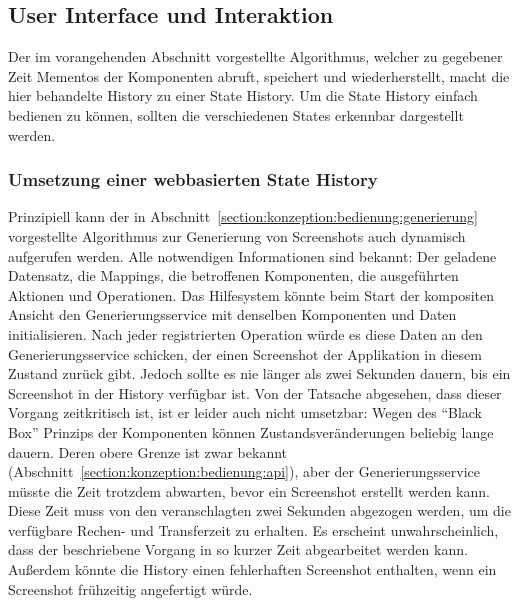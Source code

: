 \documentclass[
	headsepline,
	footsepline,
	fontsize=12pt,
	bibliography=totoc
]{scrbook}
\begin{document}
\subsection{User Interface und Interaktion}
\label{section:konzeption:history:ui}


Der im vorangehenden Abschnitt vorgestellte Algorithmus, welcher zu gegebener Zeit Mementos der Komponenten abruft, speichert und wiederherstellt, macht die hier behandelte History zu einer State History. Um die State History einfach bedienen zu können, sollten die verschiedenen States erkennbar dargestellt werden.

\subsubsection{Umsetzung einer webbasierten State History}


Prinzipiell kann der in Abschnitt~\ref{section:konzeption:bedienung:generierung} vorgestellte Algorithmus zur Generierung von Screenshots auch dynamisch aufgerufen werden. Alle notwendigen Informationen sind bekannt: Der geladene Datensatz, die Mappings, die betroffenen Komponenten, die ausgeführten Aktionen und Operationen. Das Hilfesystem könnte beim Start der kompositen Ansicht den Generierungsservice mit denselben Komponenten und Daten initialisieren. Nach jeder registrierten Operation würde es diese Daten an den Generierungsservice schicken, der einen Screenshot der Applikation in diesem Zustand zurück gibt. Jedoch sollte es nie länger als zwei Sekunden dauern, bis ein Screenshot in der History verfügbar ist. Von der Tatsache abgesehen, dass dieser Vorgang zeitkritisch ist, ist er leider auch nicht umsetzbar: Wegen des \enquote{Black Box} Prinzips der Komponenten können Zustandsveränderungen beliebig lange dauern. Deren obere Grenze ist zwar bekannt (Abschnitt~\ref{section:konzeption:bedienung:api}), aber der Generierungsservice müsste die Zeit trotzdem abwarten, bevor ein Screenshot erstellt werden kann. Diese Zeit muss von den veranschlagten zwei Sekunden abgezogen werden, um die verfügbare Rechen- und Transferzeit zu erhalten. Es erscheint unwahrscheinlich, dass der beschriebene Vorgang in so kurzer Zeit abgearbeitet werden kann. Außerdem könnte die History einen fehlerhaften Screenshot enthalten, wenn ein Screenshot frühzeitig angefertigt würde.
\end{document}
